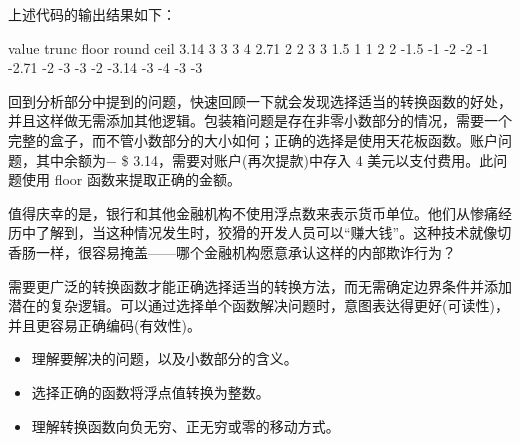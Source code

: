 上述代码的输出结果如下：

\begin{shell}
value trunc floor round ceil
 3.14     3     3     3    4
 2.71     2     2     3    3
  1.5     1     1     2    2
 -1.5    -1    -2    -2   -1
-2.71    -2    -3    -3   -2
-3.14    -3    -4    -3   -3
\end{shell}

回到分析部分中提到的问题，快速回顾一下就会发现选择适当的转换函数的好处，并且这样做无需添加其他逻辑。包装箱问题是存在非零小数部分的情况，需要一个完整的盒子，而不管小数部分的大小如何；正确的选择是使用天花板函数。账户问题，其中余额为− \$ 3.14，需要对账户(再次提款)中存入 4 美元以支付费用。此问题使用 floor 函数来提取正确的金额。

值得庆幸的是，银行和其他金融机构不使用浮点数来表示货币单位。他们从惨痛经历中了解到，当这种情况发生时，狡猾的开发人员可以“赚大钱”。这种技术就像切香肠一样，很容易掩盖——哪个金融机构愿意承认这样的内部欺诈行为？

需要更广泛的转换函数才能正确选择适当的转换方法，而无需确定边界条件并添加潜在的复杂逻辑。可以通过选择单个函数解决问题时，意图表达得更好(可读性)，并且更容易正确编码(有效性)。


\begin{itemize}
\item
理解要解决的问题，以及小数部分的含义。

\item
选择正确的函数将浮点值转换为整数。

\item
理解转换函数向负无穷、正无穷或零的移动方式。
\end{itemize}
